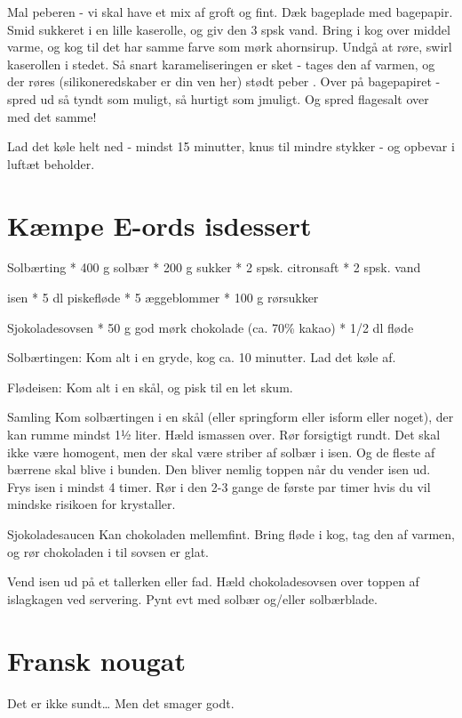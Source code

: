 \documentclass[
]{book}
\begin{document}
Mal peberen - vi skal have et mix af groft og fint.
Dæk bageplade med bagepapir.
Smid sukkeret i en lille kaserolle, og giv den 3
spsk vand. Bring i kog over middel varme,
og kog til det har samme farve som mørk ahornsirup.
Undgå at røre, swirl kaserollen i stedet.
Så snart karameliseringen er sket - tages den af varmen, og der røres (silikoneredskaber er din ven her) stødt peber . Over på bagepapiret - spred ud så tyndt som muligt, så hurtigt som jmuligt. Og spred
flagesalt over med det samme!

Lad det køle helt ned - mindst 15 minutter, knus til mindre stykker - og opbevar i luftæt beholder.

\section{Kæmpe E-ords isdessert}\label{kuxe6mpe-e-ords-isdessert}

Solbærting
* 400 g solbær
* 200 g sukker
* 2 spsk. citronsaft
* 2 spsk. vand

isen
* 5 dl piskefløde
* 5 æggeblommer
* 100 g rørsukker

Sjokoladesovsen
* 50 g god mørk chokolade (ca. 70\% kakao)
* 1/2 dl fløde

Solbærtingen:
Kom alt i en gryde, kog ca. 10 minutter. Lad det køle af.

Flødeisen:
Kom alt i en skål, og pisk til en let skum.

Samling
Kom solbærtingen i en skål (eller springform eller isform eller noget), der kan rumme
mindst 1½ liter. Hæld ismassen over. Rør forsigtigt rundt. Det skal ikke være
homogent, men der skal være striber af solbær i isen. Og de fleste af bærrene
skal blive i bunden. Den bliver nemlig toppen når du vender isen ud.
Frys isen i mindst 4 timer. Rør i den 2-3 gange de første par timer
hvis du vil mindske risikoen for krystaller.

Sjokoladesaucen
Kan chokoladen mellemfint. Bring fløde i kog, tag den af varmen, og rør
chokoladen i til sovsen er glat.

Vend isen ud på et tallerken eller fad. Hæld chokoladesovsen over toppen af
islagkagen ved servering. Pynt evt med solbær og/eller solbærblade.

\section{Fransk nougat}\label{fransk-nougat}

Det er ikke sundt\ldots{} Men det smager godt.
\end{document}

